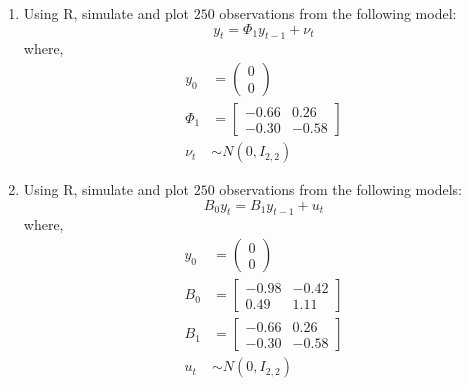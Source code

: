\begin{enumerate}
    \item Using R, simulate and plot $250$ observations from the following \varp[1]{} model:
          \[ y_t = \Phi_1 y_{t-1} + \nu_t \]
          where,
          \begin{align*}
              y_0    & = \begin{pmatrix}
                             0 \\
                             0
                         \end{pmatrix}    \\[0.5cm]
              \Phi_1 & = \begin{bmatrix}
                             -0.66 & 0.26  \\
                             -0.30 & -0.58
                         \end{bmatrix}    \\[0.5cm]
              \nu_t  & \sim N(0, I_{2, 2})
          \end{align*}

          \begin{sol}
              
          \end{sol}

    \item Using R, simulate and plot $250$ observations from the following \svarp[1]{} models:
          \[ B_0 y_t = B_1 y_{t-1} + u_t \]
          where,
          \begin{align*}
              y_0 & = \begin{pmatrix}
                          0 \\
                          0
                      \end{pmatrix}    \\[0.5cm]
              B_0 & = \begin{bmatrix}
                          -0.98 & -0.42 \\
                          0.49  & 1.11
                      \end{bmatrix}    \\[0.5cm]
              B_1 & = \begin{bmatrix}
                          -0.66 & 0.26  \\
                          -0.30 & -0.58
                      \end{bmatrix}    \\[0.5cm]
              u_t & \sim N(0, I_{2, 2})
          \end{align*}

          \begin{sol}
              
          \end{sol}
\end{enumerate}
